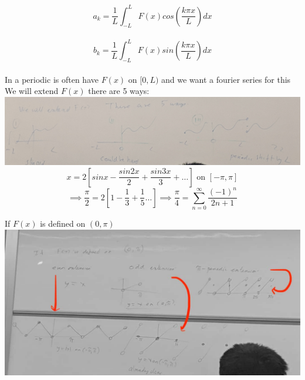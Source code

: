 \documentclass[11pt]{article}
\theoremstyle{definition}
\begin{document}
$$a_k = \frac{1}{L}\int^L_{-L}F(x)cos(\frac{k \pi x}{L})dx$$\\
$$b_k = \frac{1}{L}\int^L_{-L}F(x)sin(\frac{k \pi x}{L})dx$$\\

In a periodic is often have $F(x)$ on $[0,L)$ and we want a fourier series for this\\

We will extend $F(x)$ there are 5 ways:\\
\includegraphics[width=\textwidth]{MVIMG_20181109_102732.jpg}\\

$$x = 2[sinx -\frac{sin2x}{2} + \frac{sin3x}{3} + \dots] \text{ on } [-\pi, \pi]$$
$$\implies \frac{\pi}{2} = 2[1 - \frac{1}{3} + \frac{1}{5} \dots]\implies \frac{\pi}{4} = \sum^\infty_{n=0} \frac{(-1)^n}{2n + 1}$$



If $F(x)$ is defined on $(0,\pi)$\\
\includegraphics[width=\textwidth]{extensions.jpg}\\
\end{document}
